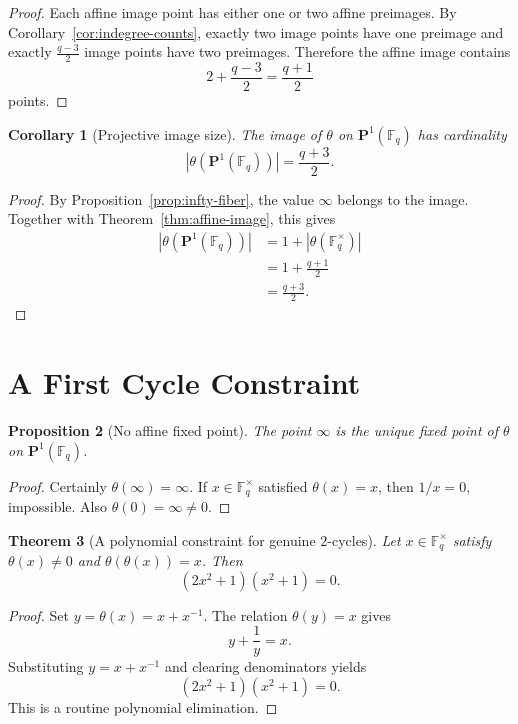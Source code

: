 \documentclass[11pt]{article}
\newtheorem{theorem}{Theorem}
\newtheorem{proposition}[theorem]{Proposition}
\newtheorem{corollary}[theorem]{Corollary}
\newcommand{\F}{\mathbb{F}}
\newcommand{\Pone}{\mathbf{P}^1}
\begin{document}
\begin{proof}
Each affine image point has either one or two affine preimages.
By Corollary~\ref{cor:indegree-counts}, exactly two image points have one preimage and exactly $\frac{q-3}{2}$ image points have two preimages.
Therefore the affine image contains
\[
2+\frac{q-3}{2}=\frac{q+1}{2}
\]
points.
\end{proof}

\begin{corollary}[Projective image size]
\label{cor:projective-image}
The image of $\theta$ on $\Pone(\F_q)$ has cardinality
\[
\left|\theta(\Pone(\F_q))\right|=\frac{q+3}{2}.
\]
\end{corollary}

\begin{proof}
By Proposition~\ref{prop:infty-fiber}, the value $\infty$ belongs to the image.
Together with Theorem~\ref{thm:affine-image}, this gives
\begin{align*}
\left|\theta(\Pone(\F_q))\right|
&=
1+\left|\theta(\F_q^\times)\right| \\
&=
1+\frac{q+1}{2} \\
&=
\frac{q+3}{2}.
\end{align*}
\end{proof}

\section{A First Cycle Constraint}

\begin{proposition}[No affine fixed point]
\label{prop:no-affine-fixed}
The point $\infty$ is the unique fixed point of $\theta$ on $\Pone(\F_q)$.
\end{proposition}

\begin{proof}
Certainly $\theta(\infty)=\infty$.
If $x\in\F_q^\times$ satisfied $\theta(x)=x$, then $1/x=0$, impossible.
Also $\theta(0)=\infty\neq 0$.
\end{proof}

\begin{theorem}[A polynomial constraint for genuine $2$-cycles]
\label{thm:two-cycle}
Let $x\in\F_q^\times$ satisfy $\theta(x)\neq 0$ and $\theta(\theta(x))=x$.
Then
\[
(2x^2+1)(x^2+1)=0.
\]
\end{theorem}

\begin{proof}
Set $y=\theta(x)=x+x^{-1}$.
The relation $\theta(y)=x$ gives
\[
y+\frac1y=x.
\]
Substituting $y=x+x^{-1}$ and clearing denominators yields
\[
(2x^2+1)(x^2+1)=0.
\]
This is a routine polynomial elimination.
\end{proof}
\end{document}
